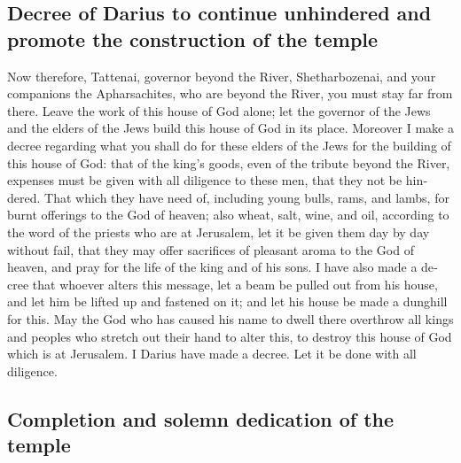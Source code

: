 \begin{paracol}{2}
\begin{otherlanguage}{english}
\hypertarget{decree-of-darius-to-continue-unhindered-and-promote-the-construction-of-the-temple}{%
\subsection{Decree of Darius to continue unhindered and promote the
construction of the
temple}\label{decree-of-darius-to-continue-unhindered-and-promote-the-construction-of-the-temple}}

 Now therefore, Tattenai, governor beyond the River,
Shetharbozenai, and your companions the Apharsachites, who are beyond
the River, you must stay far from there.  Leave the work
of this house of God alone; let the governor of the Jews and the elders
of the Jews build this house of God in its place. 
Moreover I make a decree regarding what you shall do for these elders of
the Jews for the building of this house of God: that of the king's
goods, even of the tribute beyond the River, expenses must be given with
all diligence to these men, that they not be hindered. 
That which they have need of, including young bulls, rams, and lambs,
for burnt offerings to the God of heaven; also wheat, salt, wine, and
oil, according to the word of the priests who are at Jerusalem, let it
be given them day by day without fail,  that they may
offer sacrifices of pleasant aroma to the God of heaven, and pray for
the life of the king and of his sons.  I have also made a
decree that whoever alters this message, let a beam be pulled out from
his house, and let him be lifted up and fastened on it; and let his
house be made a dunghill for this.  May the God who has
caused his name to dwell there overthrow all kings and peoples who
stretch out their hand to alter this, to destroy this house of God which
is at Jerusalem. I Darius have made a decree. Let it be done with all
diligence.

\hypertarget{completion-and-solemn-dedication-of-the-temple}{%
\subsection{Completion and solemn dedication of the
temple}\label{completion-and-solemn-dedication-of-the-temple}}


\end{otherlanguage}
\end{paracol}
